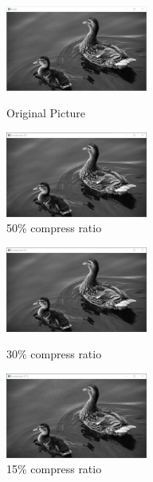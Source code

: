 \documentclass{article}
\begin{document}
            \begin{figure}[htbp]
                \centering
                \begin{minipage}[t]{0.45\linewidth}
                    \centering
                    \includegraphics[height=2.8cm]{imgs/original.png}
                    \caption{Original Picture}
                \end{minipage}
                \hfill
                \begin{minipage}[t]{0.45\linewidth}
                    \centering
                    \includegraphics[height=2.8cm]{imgs/compressed-0.5.png}
                    \caption{50\% compress ratio}
                \end{minipage}
            \end{figure}
            \begin{figure}[htbp]
                \centering
                \begin{minipage}[t]{0.45\linewidth}
                    \centering
                    \includegraphics[height=2.8cm]{imgs/compressed-0.3.png}
                    \caption{30\% compress ratio}
                \end{minipage}
                \hfill
                \begin{minipage}[t]{0.45\linewidth}
                    \centering
                    \includegraphics[height=2.8cm]{imgs/compressed-0.15.png}
                    \caption{15\% compress ratio}
                \end{minipage}
            \end{figure}
\end{document}
